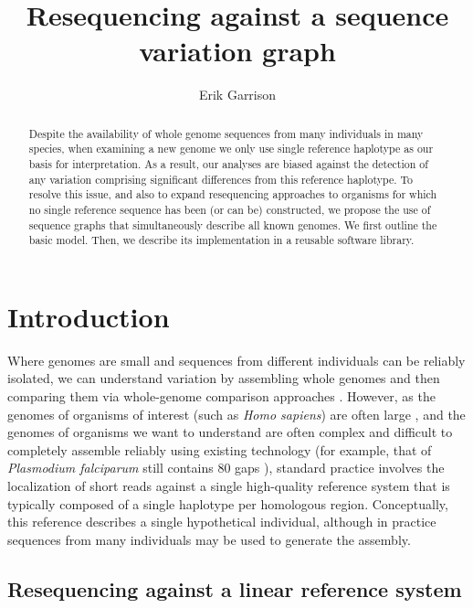 \documentclass{article}
\begin{document}
\title{Resequencing against a sequence variation graph}

\author{Erik Garrison}

\maketitle

\begin{abstract}
Despite the availability of whole genome sequences from many individuals in many species, when examining a new genome we only use single reference haplotype as our basis for interpretation. As a result, our analyses are biased against the detection of any variation comprising significant differences from this reference haplotype. To resolve this issue, and also to expand resequencing approaches to organisms for which no single reference sequence has been (or can be) constructed, we propose the use of sequence graphs that simultaneously describe all known genomes. We first outline the basic model. Then, we describe its implementation in a reusable software library.
\end{abstract}

\section{Introduction}

Where genomes are small and sequences from different individuals can be reliably isolated, we can understand variation by assembling whole genomes and then comparing them via whole-genome comparison approaches \cite{mummer}.
However, as the genomes of organisms of interest (such as \emph{Homo sapiens}) are often large \cite{pmid11237011}, and the genomes of organisms we want to understand are often complex and difficult to completely assemble reliably using existing technology (for example, that of \emph{Plasmodium falciparum} still contains 80 gaps \cite{pfalciparum, pfalciparumweb}), standard practice involves the localization of short reads against a single high-quality reference system that is typically composed of a single haplotype per homologous region. Conceptually, this reference describes a single hypothetical individual, although in practice sequences from many individuals may be used to generate the assembly.

\subsection{Resequencing against a linear reference system}
\end{document}

